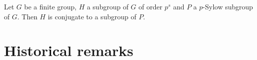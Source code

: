 \begin{lemma}
  \label{lem:sylowsareconjugates}
  Let $G$ be a finite group, $H$ a subgroup of $G$ of order $p^s$ and $P$ a $p$-Sylow subgroup of $G$.  Then $H$ is conjugate to a subgroup of $P$.
\end{lemma}

\begin{theorem}
  \label{thm:sylow2}
\end{theorem}

\section{Historical remarks}
\label{sec:grouphistory}






